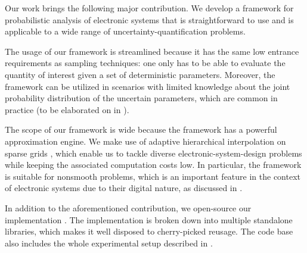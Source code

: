 Our work brings the following major contribution. We develop a framework for
probabilistic analysis of electronic systems that is straightforward to use and
is applicable to a wide range of uncertainty-quantification problems.

The usage of our framework is streamlined because it has the same low entrance
requirements as sampling techniques: one only has to be able to evaluate the
quantity of interest given a set of deterministic parameters. Moreover, the
framework can be utilized in scenarios with limited knowledge about the joint
probability distribution of the uncertain parameters, which are common in
practice (to be elaborated on in ).

The scope of our framework is wide because the framework has a powerful
approximation engine. We make use of adaptive hierarchical interpolation on
sparse grids \cite{jakeman2012, klimke2006, ma2009}, which enable us to tackle
diverse electronic-system-design problems while keeping the associated
computation costs low. In particular, the framework is suitable for nonsmooth
problems, which is an important feature in the context of electronic systems due
to their digital nature, as discussed in .

In addition to the aforementioned contribution, we open-source our
implementation \cite{sources}. The implementation is broken down into multiple
standalone libraries, which makes it well disposed to cherry-picked reusage. The
code base also includes the whole experimental setup described in
.
